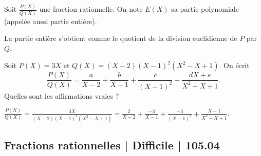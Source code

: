 \begin{question}
Soit $\frac{P(X)}{Q(X)}$ une fraction rationnelle. On note $E(X)$ sa partie polynomiale (appelée aussi partie entière).
\begin{answers}



\end{answers}
\begin{explanations}
La partie entière s'obtient comme le quotient de la division euclidienne de $P$ par $Q$.
\end{explanations}
\end{question}


\begin{question}
Soit $P(X)=3X$ et $Q(X) = (X-2)(X-1)^2(X^2-X+1)$.
On écrit 
$$\frac{P(X)}{Q(X)} = \frac{a}{X-2} + \frac{b}{X-1} +  \frac{c}{(X-1)^2}
+ \frac{dX+e}{X^2-X+1}.$$
Quelles sont les affirmations vraies ? 
\begin{answers}



\end{answers}
\begin{explanations}
$\frac{P(X)}{Q(X)} = \frac{3X}{(X-2)(X-1)^2(X^2-X+1)}
=\frac{2}{X-2} + \frac{-3}{X-1} +  \frac{-3}{(X-1)^2}
+ \frac{X+1}{X^2-X+1}$.
\end{explanations}
\end{question}



\subsection{Fractions rationnelles | Difficile | 105.04}



